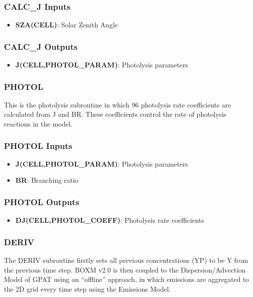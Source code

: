 \subsubsection{CALC\_J Inputs}
\begin{itemize}
    \item \textbf{SZA(CELL)}: Solar Zenith Angle
\end{itemize}

\subsubsection{CALC\_J Outputs}
\begin{itemize}
    \item \textbf{J(CELL,PHOTOL\_PARAM)}: Photolysis parameters
\end{itemize}

\subsubsection{PHOTOL}
This is the photolysis subroutine in which 96 photolysis rate coefficients are calculated from J and BR. These coefficients control the rate of photolysis reactions in the model.

\subsubsection{PHOTOL Inputs}
\begin{itemize}
    \item \textbf{J(CELL,PHOTOL\_PARAM)}: Photolysis parameters
    \item \textbf{BR}: Branching ratio
\end{itemize}

\subsubsection{PHOTOL Outputs}
\begin{itemize}
    \item \textbf{DJ(CELL,PHOTOL\_COEFF)}: Photolysis rate coefficients
\end{itemize}

\subsubsection{DERIV}
The DERIV subroutine firstly sets all previous concentrations (YP) to be Y from the previous time step. BOXM v2.0 is then coupled to the Dispersion/Advection Model of GPAT using an ``offline'' approach, in which emissions are aggregated to the 2D grid every time step using the Emissions Model. 

